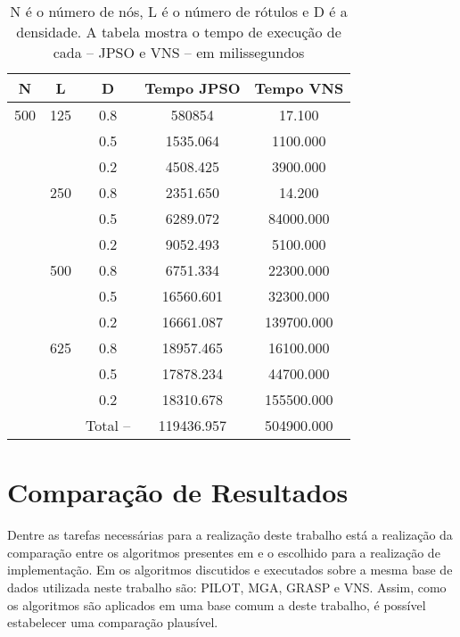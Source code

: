 \documentclass{sig-alternate-05-2015}
\begin{document}
\begin{table}[H]%
	\begin{tabular}{ccccc}
		\hline \rule[-2ex]{0pt}{5.5ex} N & L & D  & Tempo JPSO & Tempo VNS  \\ 
		\hline \rule[-2ex]{0pt}{5.5ex} 500 & 125 & 0.8 & 580854 & 17.100\\ 
		\hline \rule[-2ex]{0pt}{5.5ex}  &  & 0.5 &  1535.064 &1100.000\\ 
		\hline \rule[-2ex]{0pt}{5.5ex}  &  & 0.2 & 4508.425  &3900.000\\ 
		\hline \rule[-2ex]{0pt}{5.5ex}  & 250 & 0.8 & 2351.650 & 14.200\\ 
		\hline \rule[-2ex]{0pt}{5.5ex}  &  & 0.5 & 6289.072 &84000.000\\ 
		\hline \rule[-2ex]{0pt}{5.5ex}  &  & 0.2 & 9052.493 &5100.000\\ 
		\hline \rule[-2ex]{0pt}{5.5ex}  & 500 & 0.8 & 6751.334 &22300.000\\ 
		\hline \rule[-2ex]{0pt}{5.5ex}  &  & 0.5 & 16560.601 &32300.000\\ 
		\hline \rule[-2ex]{0pt}{5.5ex}  &  & 0.2 & 16661.087 &139700.000\\ 
		\hline \rule[-2ex]{0pt}{5.5ex}  & 625 & 0.8 & 18957.465 &16100.000\\ 
		\hline \rule[-2ex]{0pt}{5.5ex}  &  & 0.5 & 17878.234 &44700.000\\ 
		\hline \rule[-2ex]{0pt}{5.5ex}  &  & 0.2 & 18310.678 &155500.000\\ 
		\hline \rule[-2ex]{0pt}{5.5ex}  &  & Total -- & 119436.957 &  504900.000\\ 
		\hline 
	\end{tabular}  
	\caption{N é o número de nós, L é o número de rótulos e D é a densidade.  A tabela mostra o tempo de execução de cada -- JPSO e VNS -- em milissegundos}
	\label{tab8}
\end{table}
\section{Comparação de Resultados} \label{sec5}
Dentre as tarefas necessárias para a realização deste trabalho está a realização da comparação entre os algoritmos presentes em \cite{consoli2009greedy} 
e o escolhido para a realização de implementação. Em \cite{consoli2009greedy} os algoritmos discutidos e executados sobre a mesma base de dados utilizada neste 
trabalho são: PILOT, MGA, GRASP e VNS. Assim, como os algoritmos são aplicados em uma base comum a deste trabalho, é possível estabelecer uma comparação plausível. 
\end{document}
